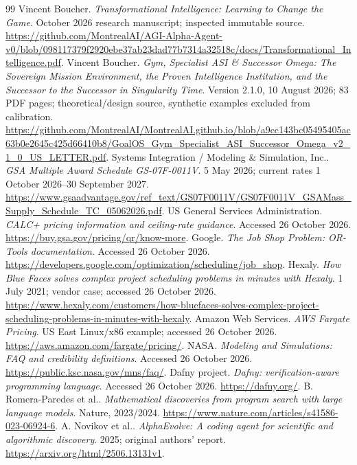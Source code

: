 \begin{thebibliography}{99}\small\setlength{\itemsep}{3pt}
Vincent Boucher. \emph{Transformational Intelligence: Learning to Change the Game}. October 2026 research manuscript; inspected immutable source. \url{https://github.com/MontrealAI/AGI-Alpha-Agent-v0/blob/098117379f2920ebe37ab23dad77b7314a32518c/docs/Transformational_Intelligence.pdf}.
Vincent Boucher. \emph{Gym, Specialist ASI \& Successor Omega: The Sovereign Mission Environment, the Proven Intelligence Institution, and the Successor to the Successor in Singularity Time}. Version 2.1.0, 10 August 2026; 83 PDF pages; theoretical/design source, synthetic examples excluded from calibration. \url{https://github.com/MontrealAI/MontrealAI.github.io/blob/a9cc143bc05495405ac63b0e2645c425d66410b8/GoalOS_Gym_Specialist_ASI_Successor_Omega_v2_1_0_US_LETTER.pdf}.
Systems Integration / Modeling \& Simulation, Inc.. \emph{GSA Multiple Award Schedule GS-07F-0011V}. 5 May 2026; current rates 1 October 2026--30 September 2027. \url{https://www.gsaadvantage.gov/ref_text/GS07F0011V/GS07F0011V_GSAMass_Supply_Schedule_TC_05062026.pdf}.
US General Services Administration. \emph{CALC+ pricing information and ceiling-rate guidance}. Accessed 26 October 2026. \url{https://buy.gsa.gov/pricing/qr/know-more}.
Google. \emph{The Job Shop Problem: OR-Tools documentation}. Accessed 26 October 2026. \url{https://developers.google.com/optimization/scheduling/job_shop}.
Hexaly. \emph{How Blue Faces solves complex project scheduling problems in minutes with Hexaly}. 1 July 2021; vendor case; accessed 26 October 2026. \url{https://www.hexaly.com/customers/how-bluefaces-solves-complex-project-scheduling-problems-in-minutes-with-hexaly}.
Amazon Web Services. \emph{AWS Fargate Pricing}. US East Linux/x86 example; accessed 26 October 2026. \url{https://aws.amazon.com/fargate/pricing/}.
NASA. \emph{Modeling and Simulations: FAQ and credibility definitions}. Accessed 26 October 2026. \url{https://public.ksc.nasa.gov/mns/faq/}.
Dafny project. \emph{Dafny: verification-aware programming language}. Accessed 26 October 2026. \url{https://dafny.org/}.
B. Romera-Paredes et al.. \emph{Mathematical discoveries from program search with large language models}. Nature, 2023/2024. \url{https://www.nature.com/articles/s41586-023-06924-6}.
A. Novikov et al.. \emph{AlphaEvolve: A coding agent for scientific and algorithmic discovery}. 2025; original authors' report. \url{https://arxiv.org/html/2506.13131v1}.

\end{thebibliography}

